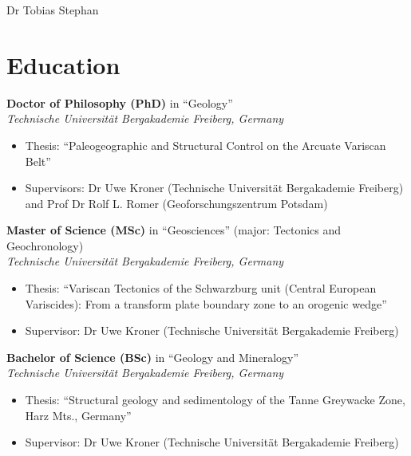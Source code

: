 \documentclass[10pt, paper=letter]{scrartcl} %
\begin{document}
\begin{cv}{\textcolor{myred}{\textsf{Dr Tobias Stephan}}}
    \section{Education}
    \begin{cvlist}{}
        \item[2019/03] \textbf{Doctor of Philosophy (PhD)} in \enquote{Geology}\\ \textit{Technische Universit\"at Bergakademie Freiberg, Germany}
        \begin{itemize}\setlength\itemsep{-0.5em}
            \item Thesis: \enquote{Paleogeographic and Structural Control on the Arcuate Variscan
                      Belt}
            \item Supervisors: Dr Uwe Kroner (Technische Universit\"at Bergakademie Freiberg) and
                  Prof Dr Rolf L. Romer (Geoforschungszentrum Potsdam)
        \end{itemize}
        \item[2013/09] \textbf{Master of Science (MSc)} in \enquote{Geosciences} (major: Tectonics and Geochronology)\\
        \textit{Technische Universit\"at Bergakademie Freiberg, Germany}
        \begin{itemize}\setlength\itemsep{-0.5em}
            \item Thesis: \enquote{Variscan Tectonics of the Schwarzburg unit (Central European
                      Variscides): From a transform plate boundary zone to an orogenic wedge}
            \item Supervisor: Dr Uwe Kroner (Technische Universit\"at Bergakademie Freiberg)
        \end{itemize}
        \item[2010/09] \textbf{Bachelor of Science (BSc)} in \enquote{Geology and Mineralogy}\\
        \textit{Technische Universit\"at Bergakademie Freiberg, Germany}
        \begin{itemize}\setlength\itemsep{-0.5em}
            \item Thesis: \enquote{Structural geology and sedimentology of the Tanne Greywacke
                      Zone, Harz Mts., Germany}
            \item Supervisor: Dr Uwe Kroner (Technische Universit\"at Bergakademie Freiberg)
        \end{itemize}
    \end{cvlist}


\end{cv}
\end{document}
